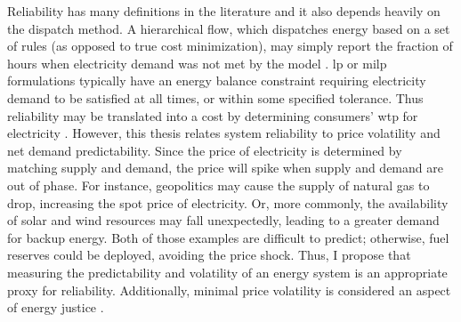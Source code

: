 Reliability has many definitions in the literature and it also depends heavily
on the dispatch method. A hierarchical flow, which dispatches energy based on a
set of rules (as opposed to true cost minimization), may simply report the
fraction of hours when electricity demand was not met by the model
\cite{donado_hyres_2020,bilil_multiobjective_2014,kamjoo_multi-objective_2016,riou_multi-objective_2021}.
\acs{lp} or \acs{milp} formulations typically have an energy balance constraint requiring 
electricity demand to be satisfied at all times, or within some specified tolerance. 
Thus reliability may be translated into a cost by determining consumers'
\ac{wtp} for electricity \cite{gorman_quest_2022, najafi_value_2021}. However,
this thesis relates system reliability to price volatility and net demand
predictability. Since the price of electricity is determined by matching supply
and demand, the price will spike when supply and demand are out of phase. For
instance, geopolitics may cause the supply of natural gas to drop, increasing
the spot price of electricity. Or, more commonly, the availability of solar and
wind resources may fall unexpectedly, leading to a greater demand for backup
energy. Both of those examples are difficult to predict; otherwise, fuel
reserves could be deployed, avoiding the price shock. Thus, I propose that
measuring the predictability and volatility of an energy system is an
appropriate proxy for reliability. Additionally, minimal price volatility is
considered an aspect of energy justice \cite{sovacool_energy_2015,
van_uffelen_revisiting_2022}.

